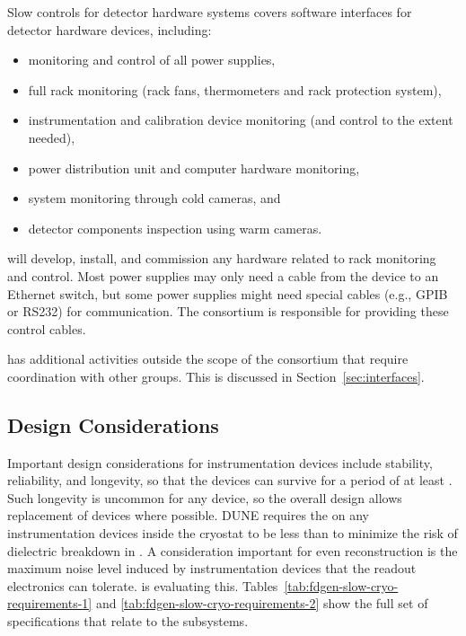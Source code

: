 Slow controls for detector hardware systems %
covers software interfaces for detector hardware devices, including:
\begin{itemize}
\item monitoring and control of all power supplies,
\item full rack monitoring (rack fans, thermometers and rack protection system),
\item instrumentation and calibration device monitoring (and control to the extent needed),
\item power distribution unit and computer hardware monitoring,
\item {} system monitoring through cold cameras, and
\item detector components inspection %
using warm cameras.
\end{itemize}
%
 will develop, install, and commission any hardware related to rack monitoring and control. Most power supplies may only need a cable from the device
to an Ethernet switch, but some power supplies might need special cables (e.g., GPIB or RS232) for communication. The  consortium is responsible for providing these control cables.

has additional activities outside the scope of the consortium that require coordination with other groups. This is discussed in Section~\ref{sec:interfaces}.

\subsection{Design Considerations}

Important design considerations for instrumentation devices include stability, reliability, and longevity, so that the devices can survive for a period of at least \dunelifetime. %
Such longevity %
is uncommon for any device, so the overall design allows replacement of devices where possible. %
DUNE requires the \efield  on any instrumentation devices inside the cryostat to be less than \localefield to minimize the risk of dielectric breakdown in \lar. %
A consideration important for even reconstruction is the maximum noise level induced by instrumentation devices that the readout electronics  can tolerate.  is evaluating this.  Tables~\ref{tab:fdgen-slow-cryo-requirements-1} and \ref{tab:fdgen-slow-cryo-requirements-2} show the full set of specifications %
that relate to the  subsystems.


